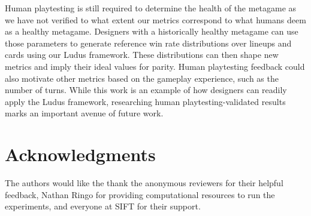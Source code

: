 \documentclass[letterpaper]{article} %
\begin{document}
Human playtesting is still required to determine the health of the metagame as we have not verified to what extent our metrics
correspond to what humans deem as a healthy metagame. Designers
with a historically healthy metagame can use those parameters to generate reference win rate distributions 
over lineups and cards using our {\sc Ludus} framework. These distributions can then shape 
new metrics and imply their ideal values for parity. Human playtesting feedback could also motivate other metrics based on the gameplay experience,
such as the number of turns. %
While this work is an example of how designers can readily apply the {\sc Ludus} framework,
researching human playtesting-validated results marks an important avenue of 
future work.

\section{Acknowledgments}
The authors would like the thank the anonymous reviewers for their helpful feedback, Nathan Ringo for providing computational resources to run the experiments, and everyone at SIFT for their support.


\end{document}
